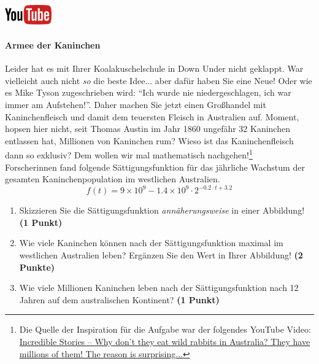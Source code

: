 \documentclass[a4paper, 9pt]{scrartcl}\usepackage[]{graphicx}\usepackage[]{xcolor}
\begin{document}
\hfill\href{https://youtu.be/Mr6eslls4J0}{\includegraphics[width =
  2cm]{img/youtube}} %
\hspace{2Ex}

\paragraph{Armee der Kaninchen}



Leider hat es mit Ihrer Koalakuschelschule in Down Under nicht geklappt. War vielleicht
auch nicht \textit{so} die beste Idee... aber daf{\"u}r haben Sie eine Neue!
Oder wie es Mike Tyson zugeschrieben wird: "`Ich wurde nie
niedergeschlagen, ich war immer am Aufstehen!"'. Daher machen Sie jetzt
einen Gro{\ss}handel mit Kaninchenfleisch und damit dem teuersten Fleisch in
Australien auf. Moment, hopsen hier nicht, seit Thomas Austin im Jahr
1860 ungef{\"a}hr 32 Kaninchen entlassen hat,
Millionen von Kaninchen rum? Wieso ist das Kaninchenfleisch dann so
exklusiv? Dem wollen wir mal mathematisch nachgehen!\footnote{Die Quelle
  der Inspiration f{\"u}r die Aufgabe war der folgendes YouTube Video:
  \href{https://youtu.be/38fuOr3tdgc?si=Li7NL_FoByML8JtT}{ Incredible
    Stories -- Why don't they eat wild rabbits in Australia? They have
    millions of them! The reason is surprising...}}
\\

Forscherinnen fand folgende S{\"a}ttigungsfunktion f{\"u}r das j{\"a}hrliche Wachstum
der gesamten Kaninchenpopulation im westlichen Australien.
\begin{equation*}
  f(t) = \ensuremath{9\times 10^{9}} - \ensuremath{1.4\times 10^{9}} \cdot 2^{-0.2 \cdot t + 3.2}
\end{equation*}

\begin{enumerate}
\item Skizzieren Sie die S{\"a}ttigungsfunktion \textit{ann{\"a}herungsweise} in einer Abbildung! \textbf{(1
    Punkt)}
\item Wie viele Kaninchen k{\"o}nnen nach der S{\"a}ttigungsfunktion maximal im
  westlichen Australien leben? Erg{\"a}nzen Sie den Wert in Ihrer Abbildung! \textbf{(2 Punkte)}
\item Wie viele Millionen Kaninchen leben nach der S{\"a}ttigungsfunktion
  nach 12 Jahren auf dem australischen Kontinent? \textbf{(1
    Punkt)}
\end{enumerate}
\end{document}
